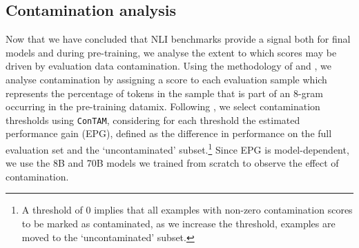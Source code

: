 \subsection{Contamination analysis}\label{subsec:contamination}

Now that we have concluded that NLI benchmarks provide a signal both for final models and during pre-training, we analyse the extent to which scores may be driven by evaluation data contamination.
Using the methodology of \citet{singh2024evaluationdatacontaminationllms} and \citet{dubey2024llama}, we analyse contamination by assigning a score to each evaluation sample which represents the percentage of tokens in the sample that is part of an 8-gram occurring in the pre-training datamix.
Following \citet{singh2024evaluationdatacontaminationllms}, we select contamination thresholds using \texttt{ConTAM}, considering for each threshold the estimated performance gain (EPG), defined as the difference in performance on the full evaluation set and the `uncontaminated' subset.\footnote{A threshold of 0 implies that all examples with non-zero contamination scores to be marked as contaminated, as we increase the threshold, examples are moved to the `uncontaminated' subset.}
Since EPG is model-dependent, we use the 8B and 70B models we trained from scratch to observe the effect of contamination. 

